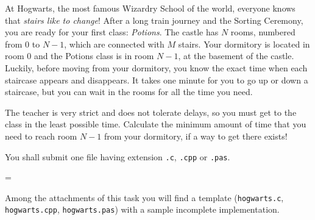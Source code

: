 \usepackage{xcolor}
\usepackage{afterpage}
\usepackage{pifont,mdframed}
\usepackage[bottom]{footmisc}



\newcommand{\inputfile}{\texttt{stdin}}
\newcommand{\outputfile}{\texttt{stdout}}

\newenvironment{warning}
  {\par\begin{mdframed}[linewidth=2pt,linecolor=gray]%
    \begin{list}{}{\leftmargin=1cm
                   \labelwidth=\leftmargin}\item[\Large\ding{43}]}
  {\end{list}\end{mdframed}\par}


	At Hogwarts, the most famous Wizardry School of the world, everyone knows that \emph{stairs like to change}! After a long train journey and the Sorting Ceremony, you are ready for your first class: \emph{Potions}. The castle has $N$ rooms, numbered from $0$ to $N-1$, which are connected with $M$ stairs. Your dormitory is located in room $0$ and the Potions class is in room $N-1$, at the basement of the castle. Luckily, before moving from your dormitory, you know the exact time when each staircase appears and disappears. It takes one minute for you to go up or down a staircase, but you can wait in the rooms for all the time you need.
	
	The teacher is very strict and does not tolerate delays, so you must get to the class in the least possible time. Calculate the minimum amount of time that you need to reach room $N-1$ from your dormitory, if a way to get there exists!


\Implementation

You shall submit one file having extension \texttt{.c}, \texttt{.cpp} or \texttt{.pas}.

\begin{warning}
Among the attachments of this task you will find a template (\texttt{hogwarts.c}, \texttt{hogwarts.cpp}, \texttt{hogwarts.pas}) with a sample incomplete implementation.
\end{warning}

